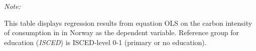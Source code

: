 \begin{table}[htbp!]
\begin{adjustbox}{width = 1\textwidth, max height = 0.95\textheight, center}
\begin{threeparttable}[b]
         \begin{tablenotes}\item \medskip \textit{Note:}
            \item This table displays regression results from equation OLS on the carbon intensity of consumption in  in Norway as the dependent variable. Reference group for education (\textit{ISCED}) is ISCED-level 0-1 (primary or no education).
         \end{tablenotes}
      \end{threeparttable}
   \end{adjustbox}
\end{table}


